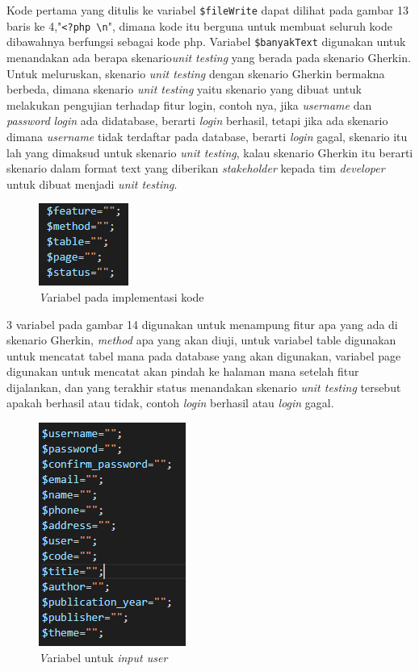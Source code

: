 \documentclass[a4paper,twoside]{article}
\begin{document}
\begin{enumerate}
Kode pertama yang ditulis ke variabel \texttt{\$fileWrite} dapat dilihat pada gambar 13 baris ke 4,"\texttt{<?php \textbackslash n}", dimana kode itu berguna untuk membuat seluruh kode dibawahnya berfungsi sebagai kode php. Variabel \texttt{\$banyakText} digunakan untuk menandakan ada berapa skenario\textit{unit testing} yang berada pada skenario Gherkin. Untuk meluruskan, skenario \textit{unit testing} dengan skenario Gherkin bermakna berbeda, dimana skenario \textit{unit testing} yaitu skenario yang dibuat untuk melakukan pengujian terhadap fitur login, contoh nya, jika \textit{username} dan \textit{password} \textit{login} ada didatabase, berarti \textit{login} berhasil, tetapi jika ada skenario dimana \textit{username} tidak terdaftar pada database, berarti \textit{login} gagal, skenario itu lah yang dimaksud untuk skenario \textit{unit testing}, kalau skenario Gherkin itu berarti skenario dalam format text yang diberikan \textit{stakeholder} kepada tim \textit{developer} untuk dibuat menjadi \textit{unit testing}.

\begin{figure}[h!]
			\includegraphics[scale=1.00]{../DokumenSkripsi/gambar/implementasi3}
			\centering
			\caption{\textit Variabel pada implementasi kode}
		\end{figure}

3 variabel pada gambar 14 digunakan untuk menampung fitur apa yang ada di skenario Gherkin, \textit{method} apa yang akan diuji, untuk variabel table digunakan untuk mencatat tabel mana pada database yang akan digunakan, variabel page digunakan untuk mencatat akan pindah ke halaman mana setelah fitur dijalankan, dan yang terakhir status menandakan skenario \textit{unit testing} tersebut apakah berhasil atau tidak, contoh \textit{login} berhasil atau \textit{login} gagal.

\begin{figure}[h!]
			\includegraphics[scale=1.00]{../DokumenSkripsi/gambar/implementasi4}
			\centering
			\caption{\textit Variabel untuk \textit{input user}}
		\end{figure}


\end{enumerate}
\end{document}
